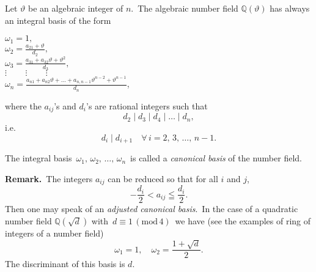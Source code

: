 \documentclass[12pt]{article}
\theoremstyle{definition}
\begin{document}
Let $\vartheta$ be an algebraic integer of  $n$.\, The algebraic number field $\mathbb{Q}(\vartheta)$ has always an integral basis of the form 

$\displaystyle\omega_1 = 1,$\\
$\displaystyle\omega_2 = \frac{a_{21}\!+\!\vartheta}{d_2},$\\
$\displaystyle\omega_3 = \frac{a_{31}\!+\!a_{32}\vartheta\!+\!\vartheta^2}{d_3},$\\
$\vdots\,\qquad\vdots\,\qquad\vdots$\\
$\displaystyle\omega_n = \frac{a_{n1}\!+\!a_{n2}\vartheta\!+\ldots+\!a_{n,n-1}\vartheta^{n-2}\!+\!\vartheta^{n-1}}{d_n}$,

where the $a_{ij}$'s and $d_i$'s are rational integers such that
               $$d_2\mid d_3\mid d_4\mid\ldots\mid d_n,$$
i.e.
    $$d_i\mid d_{i+1}\quad \forall\, i = 2,\,3,\,\ldots,\,n\!-\!1.$$

The integral basis\, $\omega_1,\,\omega_2,\,\ldots,\,\omega_n$\ is called a {\em canonical basis} of the number field.

\textbf{Remark.}\, The integers $a_{ij}$ can be reduced so that for all $i$ and $j$, 
         $$-\frac{d_i}{2} < a_{ij} \leqq \frac{d_i}{2}.$$
Then one may speak of an {\em adjusted canonical basis}.\, In the case of a quadratic number field $\mathbb{Q}(\sqrt{d})$ with\, 
$d \equiv 1\, (\mbox{mod}\, 4)$\, we have (see the examples of ring of integers of a number field)
    $$\omega_1 = 1,  \quad \omega_2 = \frac{1\!+\!\sqrt{d}}{2}.$$
The discriminant of this basis is $d$.
\end{document}
